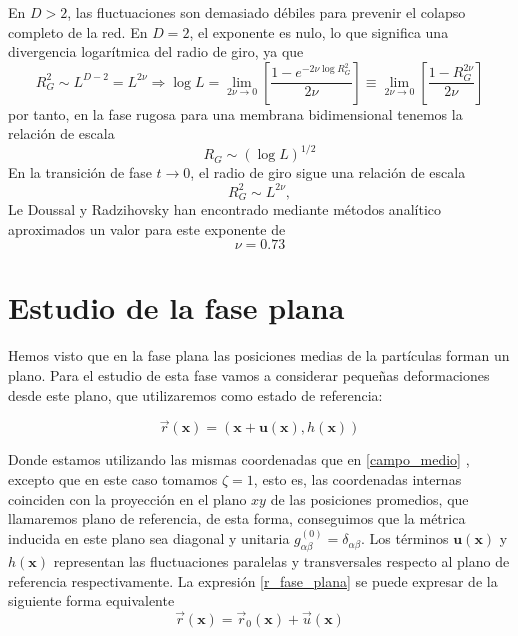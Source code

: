 En $D>2$, las fluctuaciones son demasiado débiles para prevenir el colapso
completo de la red. En $D=2$, el exponente es nulo, lo que significa una
divergencia logarítmica del radio de giro, ya que
\begin{equation}
R_G^2\sim L^{D-2}=L^{2\nu}\Rightarrow \log L=\lim_{2\nu\rightarrow
  0}\left[\frac{1-e^{-2\nu\log R^2_G}}{2\nu}\right]\equiv\lim_{2\nu\rightarrow
  0}\left[\frac{1-R^{2\nu}_G}{2\nu}\right]
\end{equation}
por tanto, en la fase rugosa para una membrana bidimensional tenemos la
relación de escala 
\begin{equation}
R_G\sim(\log L)^{1/2}
\end{equation}
En la transición de fase $t\rightarrow 0$, el radio de giro sigue una
relación de escala 
\begin{equation}
R_G^2\sim L^{2\nu},
\end{equation}
Le Doussal y Radzihovsky \cite{Doussal:nu} han encontrado mediante métodos analítico aproximados
un valor para este exponente de 
\begin{equation} 
 \nu=0.73
\end{equation}
\section{Estudio de la fase plana}

Hemos visto que en la fase plana las posiciones medias de la partículas forman
un plano. Para el estudio de esta fase vamos a considerar pequeñas
deformaciones desde este plano, que utilizaremos como estado de referencia:

\begin{equation}\label{r_fase_plana}
\vec{r}(\mathbf{x})=(\mathbf{x}+\mathbf{u(\mathbf{x})},h(\mathbf{x}))
\end{equation}

Donde estamos utilizando las mismas coordenadas que en \ref{campo_medio} , excepto que en
este caso tomamos $\zeta=1$, esto es, las coordenadas internas coinciden con
la proyección en el plano $xy$ de las posiciones promedios, que llamaremos
plano de referencia, de esta forma, conseguimos que la métrica inducida en
este plano sea diagonal y unitaria
$g^{(0)}_{\alpha\beta}=\delta_{\alpha\beta}$. Los términos
$\mathbf{u(\mathbf{x})}$ y $h(\mathbf{x})$ 
representan las fluctuaciones paralelas y transversales respecto al plano de
referencia respectivamente. La expresión \eqref{r_fase_plana} se puede
expresar de la siguiente forma equivalente
\begin{equation}\label{deformacion}
\vec{r}(\mathbf{x})=\vec{r}_0(\mathbf{x})+\vec{u}(\mathbf{x})
\end{equation}

